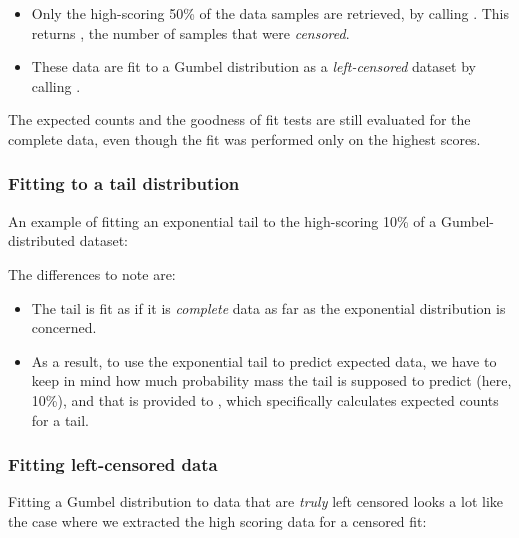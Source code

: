 \begin{itemize}
\item Only the high-scoring 50\% of the data samples are
      retrieved, by calling 
      .
      This returns , the number of samples that 
      were \emph{censored}.

\item These data are fit to a Gumbel distribution
      as a \emph{left-censored} dataset by calling
      .
\end{itemize}

The expected counts and the goodness of fit tests are still evaluated
for the complete data, even though the fit was performed only on the
highest scores.


\subsubsection{Fitting to a tail distribution}

An example of fitting an exponential tail to the high-scoring 10\% of
a Gumbel-distributed dataset:



The differences to note are:

\begin{itemize}
\item The tail is fit as if it is \emph{complete} data as far
      as the exponential distribution is concerned.

\item As a result, to use the exponential tail to predict expected
      data, we have to keep in mind how much probability mass the tail
      is supposed to predict (here, 10\%), and that
      is provided to
      , which specifically
      calculates expected counts for a tail.
\end{itemize}

\subsubsection{Fitting left-censored data}

Fitting a Gumbel distribution to data that are \emph{truly} left
censored looks a lot like the case where we extracted the high scoring
data for a censored fit:



